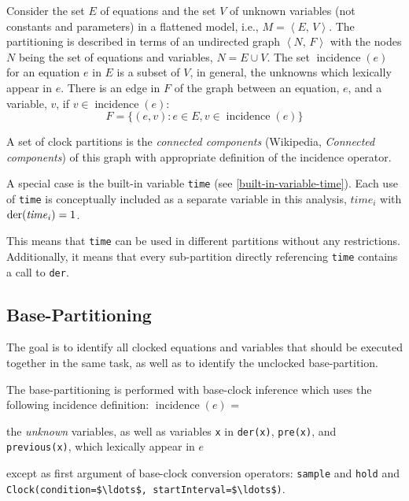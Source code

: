 Consider the set $E$ of equations and the set $V$ of unknown variables (not constants and parameters) in a flattened model, i.e., $M = \left\langle E,\, V \right\rangle$.
The partitioning is described in terms of an undirected graph $\left\langle N,\, F \right\rangle$ with the nodes $N$ being the set of equations and variables, $N = E \cup V$.
The set $\operatorname{incidence}(e)$ for an equation $e$ in $E$ is a subset of $V$, in general, the unknowns which lexically appear in $e$.
There is an edge in $F$ of the graph between an equation, $e$, and a variable, $v$, if $v \in \operatorname{incidence}(e)$:
\begin{equation*}
F = \{(e, v) : e \in E, v \in \operatorname{incidence}(e)\}
\end{equation*}

A set of clock partitions is the \emph{connected components} (Wikipedia, \emph{Connected components}) of this graph with appropriate definition of the incidence operator.

A special case is the built-in variable \lstinline!time! (see \cref{built-in-variable-time}).
Each use of \lstinline!time! is conceptually included as a separate variable in this analysis, $\mathit{time}_i$ with $\text{\lstinline!der!}(\mathit{time}_{i}) = 1$.
\begin{nonnormative}
This means that \lstinline!time! can be used in different partitions without any restrictions.
Additionally, it means that every sub-partition directly referencing \lstinline!time! contains a call to \lstinline!der!.
\end{nonnormative}

\subsection{Base-Partitioning}\label{base-clock-partitioning}

The goal is to identify all clocked equations and variables that should be executed together in the same task, as well as to identify the unclocked base-partition.

The base-partitioning is performed with base-clock inference which uses the following incidence definition:
$\operatorname{incidence}(e)$ =
\begin{list}{}{\setlength{\leftmargin}{2em}\setlength{\topsep}{-\parskip}}
\item
the \emph{unknown} variables, as well as variables \lstinline!x! in \lstinline!der(x)!, \lstinline!pre(x)!, and \lstinline!previous(x)!, which lexically appear in $e$
\begin{list}{}{\setlength{\leftmargin}{2em}\setlength{\topsep}{-\parskip}}
\item
except as first argument of base-clock conversion operators: \lstinline!sample! and \lstinline!hold! and \lstinline!Clock(condition=$\ldots$, startInterval=$\ldots$)!.
\end{list}
\end{list}\vspace{\parskip}%

